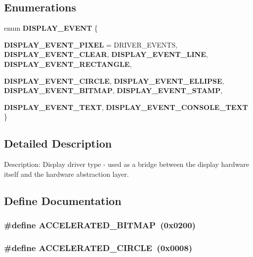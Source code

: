 \subsection*{Enumerations}
\begin{DoxyCompactItemize}
\item 
enum {\bf DISPLAY\_\-EVENT} \{ \par
{\bf DISPLAY\_\-EVENT\_\-PIXEL} =  DRIVER\_\-EVENTS, 
{\bf DISPLAY\_\-EVENT\_\-CLEAR}, 
{\bf DISPLAY\_\-EVENT\_\-LINE}, 
{\bf DISPLAY\_\-EVENT\_\-RECTANGLE}, 
\par
{\bf DISPLAY\_\-EVENT\_\-CIRCLE}, 
{\bf DISPLAY\_\-EVENT\_\-ELLIPSE}, 
{\bf DISPLAY\_\-EVENT\_\-BITMAP}, 
{\bf DISPLAY\_\-EVENT\_\-STAMP}, 
\par
{\bf DISPLAY\_\-EVENT\_\-TEXT}, 
{\bf DISPLAY\_\-EVENT\_\-CONSOLE\_\-TEXT}
 \}
\end{DoxyCompactItemize}


\subsection{Detailed Description}
Description: Display driver type -\/ used as a bridge between the display hardware itself and the hardware abstraction layer. 

\subsection{Define Documentation}
\subsubsection[{ACCELERATED\_\-BITMAP}]{\setlength{\rightskip}{0pt plus 5cm}\#define ACCELERATED\_\-BITMAP~(0x0200)}\label{display_8h_ae4e049be5b0a8532f5c24152352d47fc}
\subsubsection[{ACCELERATED\_\-CIRCLE}]{\setlength{\rightskip}{0pt plus 5cm}\#define ACCELERATED\_\-CIRCLE~(0x0008)}\label{display_8h_a80eda141cf6655bf73cab26fe18055ea}
